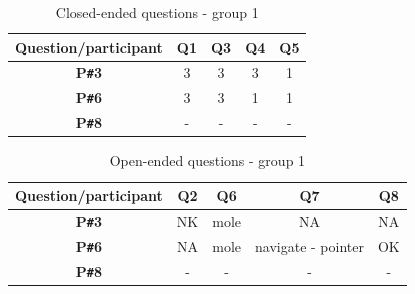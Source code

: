 \begin{table}[!ht]
    \centering
    \begin{tabular}{c|c|c|c|c}
    \hline
    \multicolumn{1}{|c|}{\textbf{Question/participant}} &
    \multicolumn{1}{c|}{\textbf{Q1}} &
    \multicolumn{1}{c|}{\textbf{Q3}} &
    \multicolumn{1}{c|}{\textbf{Q4}} &
    \multicolumn{1}{c|}{\textbf{Q5}} \\ \hline
    \multicolumn{1}{|c|}{\textbf{P\texttt{\#}3}} &
    \multicolumn{1}{c|}{3} &
    \multicolumn{1}{c|}{3} &
    \multicolumn{1}{c|}{3} &
    \multicolumn{1}{c|}{1} \\ \hline
    \multicolumn{1}{|c|}{\textbf{P\texttt{\#}6}} &
    \multicolumn{1}{c|}{3} &
    \multicolumn{1}{c|}{3} &
    \multicolumn{1}{c|}{1} &
    \multicolumn{1}{c|}{1} \\ \hline
    \multicolumn{1}{|c|}{\textbf{P\texttt{\#}8}} &
    \multicolumn{1}{c|}{-} &
    \multicolumn{1}{c|}{-} &
    \multicolumn{1}{c|}{-} &
    \multicolumn{1}{c|}{-} \\ \hline
    \end{tabular}
    \caption{Closed-ended questions - group 1}
    \label{tab:closedendedquestiongroup1}
\end{table}

\begin{table}[!ht]
    \centering
    \begin{tabular}{c|c|c|c|c}
    \hline
    \multicolumn{1}{|c|}{\textbf{Question/participant}} &
    \multicolumn{1}{c|}{\textbf{Q2}} &
    \multicolumn{1}{c|}{\textbf{Q6}} &
    \multicolumn{1}{c|}{\textbf{Q7}} &
    \multicolumn{1}{c|}{\textbf{Q8}} \\ \hline
    \multicolumn{1}{|c|}{\textbf{P\texttt{\#}3}} &
    \multicolumn{1}{c|}{NK} &
    \multicolumn{1}{c|}{mole} &
    \multicolumn{1}{c|}{NA} &
    \multicolumn{1}{c|}{NA} \\ \hline
    \multicolumn{1}{|c|}{\textbf{P\texttt{\#}6}} &
    \multicolumn{1}{c|}{NA} &
    \multicolumn{1}{c|}{mole} &
    \multicolumn{1}{c|}{navigate - pointer} &
    \multicolumn{1}{c|}{OK} \\ \hline
    \multicolumn{1}{|c|}{\textbf{P\texttt{\#}8}} &
    \multicolumn{1}{c|}{-} &
    \multicolumn{1}{c|}{-} &
    \multicolumn{1}{c|}{-} &
    \multicolumn{1}{c|}{-} \\ \hline
    \end{tabular}
    \caption{Open-ended questions - group 1}
    \label{tab:openendedquestiongroup1}
\end{table}

